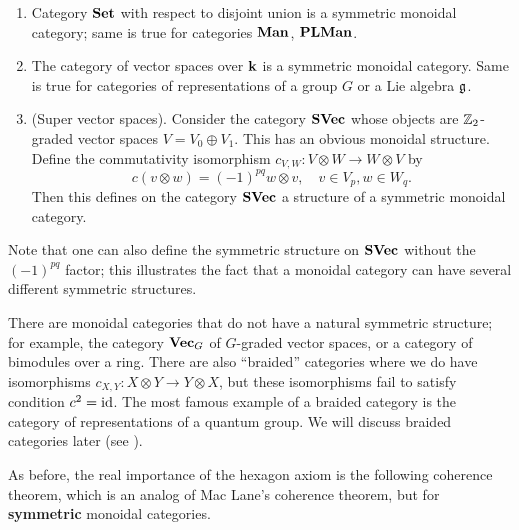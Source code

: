\begin{example}\par\noindent

  \begin{enumerate}
    \item Category $\mathbf{Set}$ with respect to disjoint union is a
      symmetric monoidal category; same is true for categories
      $\mathbf{Man}$, $\mathbf{PLMan}$.
    \item
      The category of vector spaces over $\mathbf{k}$ is a symmetric monoidal category.
      Same is true for categories of representations of a group $G$ or
      a Lie algebra $\mathfrak{g}$.
    \item (Super vector spaces). Consider the category $\mathbf{SVec}$ whose
      objects are $\mathbb{Z}_2$-graded vector spaces $V=V_0\oplus V_1$. This
      has an obvious monoidal structure.
      Define the commutativity isomorphism $c_{V,W}\colon V\otimes W
      \to W\otimes V$ by
      $$
      c(v\otimes w)=(-1)^{pq} w\otimes v, \quad v\in V_p, w\in W_q.
      $$
      Then this defines on the category $\mathbf{SVec}$ a structure of a
      symmetric monoidal category.
  \end{enumerate}

\end{example}
Note that one can also define the symmetric structure on $\mathbf{SVec}$ without the
$(-1)^{pq}$ factor; this illustrates the fact that a monoidal category can have
several different symmetric structures.
\begin{remark}
  There are monoidal categories that do not have a natural symmetric structure;
  for example, the category $\mathbf{Vec}_G$ of $G$-graded vector spaces, or a
  category
  of bimodules over a ring. There are also ``braided'' categories where we do
  have isomorphisms $c_{X,Y}\colon X\otimes Y \to Y\otimes X$, but these
  isomorphisms fail to satisfy condition $c^2=\operatorname{id}$. The  most famous example of
  a braided  category  is the category of representations of a quantum group. We
  will discuss braided categories later (see ).
\end{remark}

As before, the real importance of the hexagon axiom is the following coherence
theorem, which is an analog of Mac Lane's coherence theorem, but for
\textbf{symmetric} monoidal categories.

